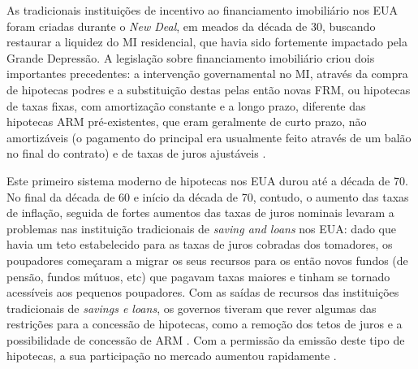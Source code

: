 \documentclass[
	12pt,				%
	oneside,			%
	a4paper,			%
	chapter=TITLE,		%
	section=TITLE,		%
	english,			%
	brazil				%
	]{abntex2}
\begin{document}
\begin{refsection}
As tradicionais instituições de incentivo ao financiamento imobiliário nos EUA
foram criadas durante o \emph{New Deal}, em meados da década de 30, buscando
restaurar a liquidez do \gls{MI} residencial, que havia sido fortemente
impactado pela Grande Depressão. A legislação sobre financiamento imobiliário
criou dois importantes precedentes: a intervenção governamental no \gls{MI},
através da compra de hipotecas podres e a substituição destas pelas então novas
\gls{FRM}, ou hipotecas de taxas fixas, com amortização constante e a longo
prazo, diferente das hipotecas \gls{ARM} pré-existentes, que eram geralmente de
curto prazo, não amortizáveis (o pagamento do principal era usualmente feito
através de um balão no final do contrato) e de taxas de juros ajustáveis
\autocite[p.~41-42]{green}.

Este primeiro sistema moderno de hipotecas nos EUA durou até a década de 70. No
final da década de 60 e início da década de 70, contudo, o aumento das taxas de
inflação, seguida de fortes aumentos das taxas de juros nominais levaram a
problemas nas instituição tradicionais de \emph{saving and loans} nos EUA: dado que
havia um teto estabelecido para as taxas de juros cobradas dos tomadores, os
poupadores começaram a migrar os seus recursos para os então novos fundos (de
pensão, fundos mútuos, etc) que pagavam taxas maiores e tinham se tornado
acessíveis aos pequenos poupadores. Com as saídas de recursos das instituições
tradicionais de \emph{savings e loans}, os governos tiveram que rever algumas das
restrições para a concessão de hipotecas, como a remoção dos tetos de juros e a
possibilidade de concessão de \gls{ARM} \autocite[p.39]{green}. Com a permissão da
emissão deste tipo de hipotecas, a sua participação no mercado aumentou
rapidamente \autocite[p.47]{green}.


\end{refsection}
\end{document}
